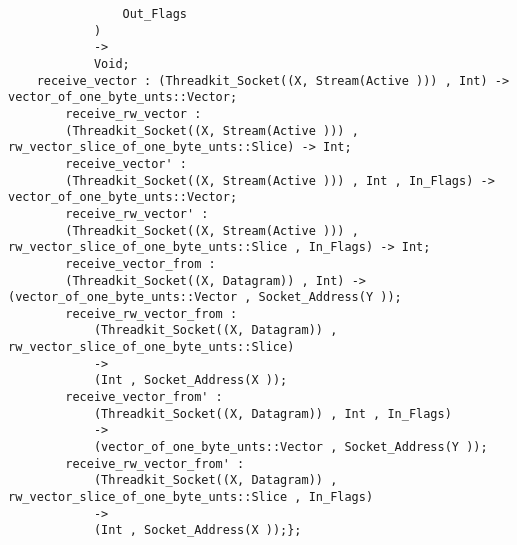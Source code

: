 \begin{verbatim}
                Out_Flags
            )
            ->
            Void;
    receive_vector : (Threadkit_Socket((X, Stream(Active ))) , Int) -> vector_of_one_byte_unts::Vector;
        receive_rw_vector :
        (Threadkit_Socket((X, Stream(Active ))) , rw_vector_slice_of_one_byte_unts::Slice) -> Int;
        receive_vector' :
        (Threadkit_Socket((X, Stream(Active ))) , Int , In_Flags) -> vector_of_one_byte_unts::Vector;
        receive_rw_vector' :
        (Threadkit_Socket((X, Stream(Active ))) , rw_vector_slice_of_one_byte_unts::Slice , In_Flags) -> Int;
        receive_vector_from :
        (Threadkit_Socket((X, Datagram)) , Int) -> (vector_of_one_byte_unts::Vector , Socket_Address(Y ));
        receive_rw_vector_from :
            (Threadkit_Socket((X, Datagram)) , rw_vector_slice_of_one_byte_unts::Slice)
            ->
            (Int , Socket_Address(X ));
        receive_vector_from' :
            (Threadkit_Socket((X, Datagram)) , Int , In_Flags)
            ->
            (vector_of_one_byte_unts::Vector , Socket_Address(Y ));
        receive_rw_vector_from' :
            (Threadkit_Socket((X, Datagram)) , rw_vector_slice_of_one_byte_unts::Slice , In_Flags)
            ->
            (Int , Socket_Address(X ));};
\end{verbatim}

